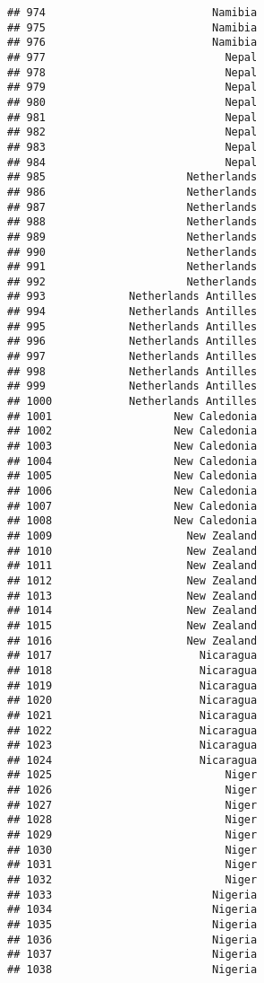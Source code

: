 \documentclass[]{article}
\begin{document}
\begin{verbatim}
## 974                          Namibia
## 975                          Namibia
## 976                          Namibia
## 977                            Nepal
## 978                            Nepal
## 979                            Nepal
## 980                            Nepal
## 981                            Nepal
## 982                            Nepal
## 983                            Nepal
## 984                            Nepal
## 985                      Netherlands
## 986                      Netherlands
## 987                      Netherlands
## 988                      Netherlands
## 989                      Netherlands
## 990                      Netherlands
## 991                      Netherlands
## 992                      Netherlands
## 993             Netherlands Antilles
## 994             Netherlands Antilles
## 995             Netherlands Antilles
## 996             Netherlands Antilles
## 997             Netherlands Antilles
## 998             Netherlands Antilles
## 999             Netherlands Antilles
## 1000            Netherlands Antilles
## 1001                   New Caledonia
## 1002                   New Caledonia
## 1003                   New Caledonia
## 1004                   New Caledonia
## 1005                   New Caledonia
## 1006                   New Caledonia
## 1007                   New Caledonia
## 1008                   New Caledonia
## 1009                     New Zealand
## 1010                     New Zealand
## 1011                     New Zealand
## 1012                     New Zealand
## 1013                     New Zealand
## 1014                     New Zealand
## 1015                     New Zealand
## 1016                     New Zealand
## 1017                       Nicaragua
## 1018                       Nicaragua
## 1019                       Nicaragua
## 1020                       Nicaragua
## 1021                       Nicaragua
## 1022                       Nicaragua
## 1023                       Nicaragua
## 1024                       Nicaragua
## 1025                           Niger
## 1026                           Niger
## 1027                           Niger
## 1028                           Niger
## 1029                           Niger
## 1030                           Niger
## 1031                           Niger
## 1032                           Niger
## 1033                         Nigeria
## 1034                         Nigeria
## 1035                         Nigeria
## 1036                         Nigeria
## 1037                         Nigeria
## 1038                         Nigeria

\end{verbatim}
\end{document}

